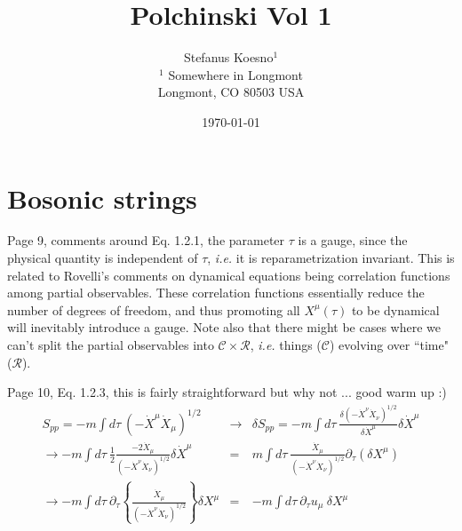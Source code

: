 \documentclass[aps,preprint,preprintnumbers,nofootinbib,showpacs,prd]{revtex4-1}
\newcommand{\ie}{{\it i.e.} }
\newcommand{\nbea}{\begin{eqnarray*}}
\newcommand{\neea}{\end{eqnarray*}}
\begin{document}
\title{Polchinski Vol 1}
\bigskip
\author{Stefanus Koesno$^1$\\
$^1$ Somewhere in Longmont\\ Longmont, CO 80503 USA\\
}
%
\date{\today}
%
\begin{abstract}


\end{abstract}
%
\maketitle

\section{Bosonic strings}

\renewcommand{\theequation}{A.\arabic{equation}}  %
\setcounter{equation}{0}  %

Page 9, comments around Eq. 1.2.1, the parameter $\tau$ is a gauge, since the physical quantity is independent of $\tau$, \ie it is reparametrization invariant. This is related to Rovelli's comments on dynamical equations being correlation functions among partial observables. These correlation functions essentially reduce the number of degrees of freedom, and thus promoting all $X^\mu(\tau)$ to be dynamical will inevitably introduce a gauge. Note also that there might be cases where we can't split the partial observables into $\mathcal{C} \times \mathcal{R}$, \ie things ($\mathcal{C}$) evolving over ``time" ($\mathcal{R}$).

Page 10, Eq. 1.2.3, this is fairly straightforward but why not ... good warm up :)
%
\nbea
S_{pp} = -m \int d\tau~\left ( - \dot X^\mu \dot X_\mu \right ) ^{1/2} & \rightarrow & \delta S_{pp} = -m \int d\tau~ \frac {\delta \left ( - \dot X^\nu \dot X_\nu \right ) ^{1/2}} {\delta \dot X^\mu} \delta \dot X^\mu\\
\rightarrow -m \int d\tau~ \frac{1}{2}\frac {-2 \dot X_\mu } {\left ( - \dot X^\nu \dot X_\nu \right ) ^{1/2}} \delta \dot X^\mu & = & m \int d\tau~ \frac {\dot X_\mu } {\left ( - \dot X^\nu \dot X_\nu \right ) ^{1/2}} \partial_\tau (\delta X^\mu)\\
\rightarrow -m \int d\tau~ \partial_\tau \left \{ \frac {\dot X_\mu } {\left ( - \dot X^\nu \dot X_\nu \right ) ^{1/2}} \right \} \delta X^\mu & = & -m \int d\tau~ \partial_\tau u_\mu ~ \delta X^\mu
\neea
%
\end{document}
